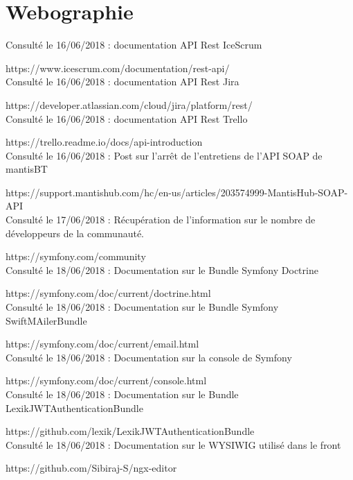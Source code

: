 \documentclass[12pt, twoside, openright]{report}
\begin{document}
\section{Webographie}

Consulté le 16/06/2018 : documentation API Rest IceScrum

https://www.icescrum.com/documentation/rest-api/ \\

Consulté le 16/06/2018 : documentation API Rest Jira 

https://developer.atlassian.com/cloud/jira/platform/rest/ \\

Consulté le 16/06/2018 : documentation API Rest Trello

https://trello.readme.io/docs/api-introduction \\

Consulté le 16/06/2018 : Post sur l'arrêt de l'entretiens de l'API SOAP de mantisBT

https://support.mantishub.com/hc/en-us/articles/203574999-MantisHub-SOAP-API \\

Consulté le 17/06/2018 : Récupération de l'information sur le nombre de développeurs de la communauté.

https://symfony.com/community \\

Consulté le 18/06/2018 : Documentation sur le Bundle Symfony Doctrine

https://symfony.com/doc/current/doctrine.html \\

Consulté le 18/06/2018 : Documentation sur le Bundle Symfony SwiftMAilerBundle

https://symfony.com/doc/current/email.html \\

Consulté le 18/06/2018 : Documentation sur la console de Symfony

https://symfony.com/doc/current/console.html \\

Consulté le 18/06/2018 : Documentation sur le Bundle LexikJWTAuthenticationBundle

https://github.com/lexik/LexikJWTAuthenticationBundle \\

Consulté le 18/06/2018 : Documentation sur le WYSIWIG utilisé dans le front

https://github.com/Sibiraj-S/ngx-editor \\
\end{document}
